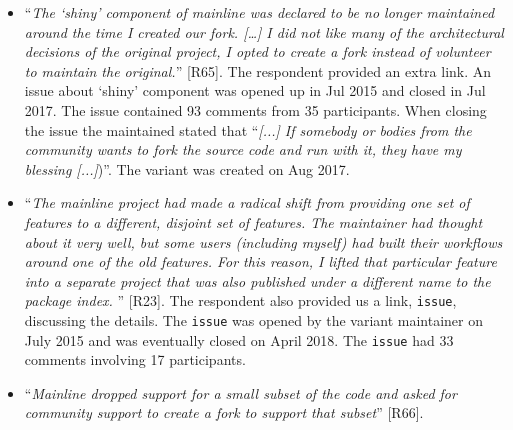 \begin{itemize}[leftmargin=*]
\item ``\emph{The `shiny' component of mainline was declared to be no longer maintained around the time I created our fork. [\ldots] I did not like many of the architectural decisions of the original project, I opted to create a fork instead of volunteer to maintain the original.}'' [R65]. The respondent provided an extra link. An issue about `shiny' component was opened up in Jul 2015 and closed in Jul 2017. The issue contained 93 comments from 35 participants. When closing the issue the maintained stated that ``\textit{[...] If somebody or bodies from the community wants to fork the source code and run with it, they have my blessing [...]})''. The variant was created on Aug 2017.
\item ``\emph{The mainline project had made a radical shift from providing one set of features %
to a different, disjoint set of features. %
The maintainer had thought about it very well, but some users (including myself) had built their workflows around one of the old features. For this reason, I lifted that particular feature into a separate project that was also published under a different name to the package index.%
}'' [R23]. The respondent also provided us a link, \gh \texttt{issue}, discussing the details. The \texttt{issue} was opened by the variant maintainer on July 2015 and was eventually closed on April 2018. The \texttt{issue} had 33 comments involving 17 participants. %

\item ``\textit{Mainline dropped support for a small subset of the code and asked for community support to create a fork to support that subset}'' [R66].
\end{itemize}

